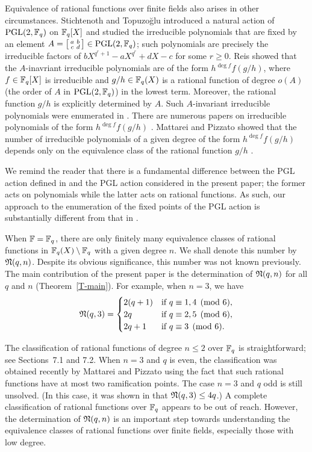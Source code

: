 \documentclass{amsart}
\numberwithin{equation}{section}
\theoremstyle{definition}
\newcommand{\f}{\Bbb F}
\begin{document}
Equivalence of rational functions over finite fields also arises in other circumstances. Stichtenoth and Topuzo\u glu \cite{Stichtenoth-Topuzoglu-FFA-2012} introduced a natural action of $\text{PGL}(2,\f_q)$ on $\f_q[X]$ and studied the irreducible polynomials that are fixed by an element $A=\left[\begin{smallmatrix}a&b\cr c&d\end{smallmatrix}\right]\in\text{PGL}(2,\f_q)$; such polynomials are precisely the irreducible factors of $bX^{q^r+1}-aX^{q^r}+dX-c$ for some $r\ge 0$. Reis \cite{Reis-JPAA-2020} showed that the $A$-inavriant irreducible polynomials  are of the form $h^{\deg f}f(g/h)$, where $f\in\f_q[X]$ is irreducible and $g/h\in\f_q(X)$ is a rational function of degree $o(A)$ (the order of $A$ in $\text{PGL}(2,\f_q)$) in the lowest term. Moreover, the rational function $g/h$ is explicitly determined by $A$. Such $A$-invariant irreducible polynomials were enumerated in \cite{Reis-FFA-2020}. There are numerous papers on irreducible polynomials of the form $h^{\deg f}f(g/h)$ \cite{Ahmadi-FFA-2011, Mattarei-Pizzato-FFA-2017, Mattarei-Pizzato-FFA-2022, Panario-Reis-Wang-JPAA-2020}. Mattarei and Pizzato \cite{Mattarei-Pizzato-FFA-2017} showed that the number of irreducible polynomials of a given degree of the form $h^{\deg f}f(g/h)$ depends only on the equivalence class of the rational function $g/h$ .

We remind the reader that there is a fundamental difference between the PGL action defined in \cite{Stichtenoth-Topuzoglu-FFA-2012} and the PGL action considered in the present paper; the former acts on polynomials while the latter acts on rational functions. As such, our approach to the enumeration of the fixed points of the PGL action is substantially different from that in \cite{Reis-FFA-2020}.


When $\f=\f_q$, there are only finitely many equivalence classes of rational functions in $\f_q(X)\setminus\f_q$ with a given degree $n$. We shall denote this number by $\frak N(q,n)$. Despite its obvious significance, this number was not known previously.  The main contribution of the present paper is the determination of $\frak N(q,n)$ for all $q$ and $n$ (Theorem~\ref{T-main}). For example, when $n=3$, we have
\[
\frak N(q,3)=
\begin{cases}
2(q+1)&\text{if}\ q\equiv 1,4\pmod 6,\cr
2q&\text{if}\ q\equiv 2,5\pmod 6,\cr
2q+1&\text{if}\ q\equiv 3\pmod 6.
\end{cases}
\]

The classification of rational functions of degree $n\le 2$ over $\f_q$ is straightforward; see Sections~7.1 and 7.2. When $n=3$ and $q$ is even, the classification was obtained recently by Mattarei and Pizzato \cite{Mattarei-Pizzato-arXiv2104.00111} using the fact that such rational functions have at most two ramification points. The case $n=3$ and $q$ odd is still unsolved. (In this case, it was shown in \cite{Mattarei-Pizzato-arXiv2104.00111} that $\frak N(q,3)\le 4q$.)
A complete classification of rational functions over $\f_q$ appears to be out of reach. However, the determination of $\frak N(q,n)$ is an important step towards understanding the equivalence classes of rational functions over finite fields, especially those with low degree.
\end{document}
